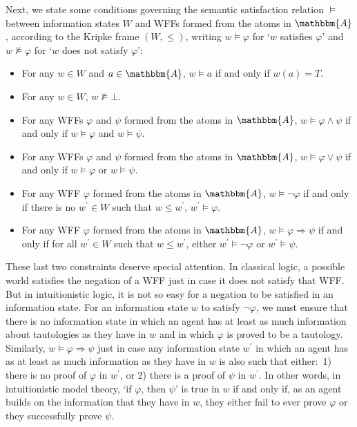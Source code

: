 \documentclass[11pt]{article}
\theoremstyle{definition}
\theoremstyle{remark}
\begin{document}
Next, we state some conditions governing the semantic satisfaction relation $\vDash$ between information states $W$ and WFFs formed from the atoms in $\mathbbm{A}$, according to the Kripke frame $(W,\leq)$, writing $w\vDash\varphi$ for `$w$ satisfies $\varphi$' and $w\not\vDash\varphi$ for `$w$ does not satisfy $\varphi$':
\begin{itemize}
    \item For any $w\in W$ and $a\in\mathbbm{A}$, $w\vDash a$ if and only if $w(a)=T$.

    \item For any $w\in W$, $w\not\vDash\bot$. 

    \item For any WFFs $\varphi$ and $\psi$ formed from the atoms in $\mathbbm{A}$, $w\vDash \varphi\wedge \psi$ if and only if $w\vDash\varphi$ and $w\vDash\psi$.

    \item For any WFFs $\varphi$ and $\psi$ formed from the atoms in $\mathbbm{A}$, $w\vDash \varphi\vee \psi$ if and only if $w\vDash\varphi$ or $w\vDash\psi$.

    \item For any WFF $\varphi$ formed from the atoms in $\mathbbm{A}$, $w\vDash \neg \varphi$ if and only if there is no $w^{\prime}\in W$ such that $w\leq w^{\prime}$, $w^{\prime}\vDash\varphi$. 

    \item For any WFF $\varphi$ formed from the atoms in $\mathbbm{A}$, $w\vDash \varphi\Rightarrow \psi$ if and only if for all $w^{\prime}\in W$ such that $w\leq w^{\prime}$, either $w^{\prime}\vDash\neg\varphi$ or $w^{\prime}\vDash\psi$.
\end{itemize}
These last two constraints deserve special attention. In classical logic, a possible world satisfies the negation of a WFF just in case it does not satisfy that WFF. But in intuitionistic logic, it is not so easy for a negation to be satisfied in an information state. For an information state $w$ to satisfy $\neg \varphi$, we must ensure that there is no information state in which an agent has at least as much information about tautologies as they have in $w$ and in which $\varphi$ is proved to be a tautology. Similarly, $w\vDash \varphi\Rightarrow \psi$ just in case any information state $w^{\prime}$ in which an agent has as at least as much information as they have in $w$ is also such that either:\ 1) there is no proof of $\varphi$ in $w^{\prime}$, or 2) there is a proof of $\psi$ in $w^{\prime}$. In other words, in intuitionistic model theory, `if $\varphi$, then $\psi$' is true in $w$ if and only if, as an agent builds on the information that they have in $w$, they either fail to ever prove $\varphi$ or they successfully prove $\psi$.\par 
\end{document}

